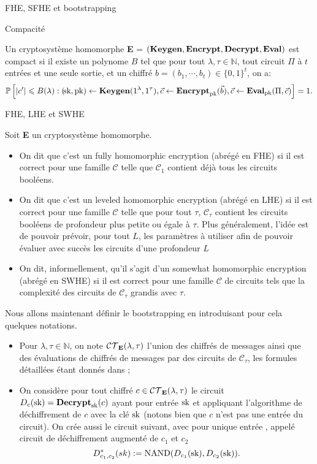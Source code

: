 \begin{section}{FHE, SFHE et bootstrapping}
\begin{definition}{Compacité}

Un cryptosystème homomorphe \textbf{E} = $(\text{\textbf{Keygen}}, \text{\textbf{Encrypt}}, \text{\textbf{Decrypt}}, \text{\textbf{Eval}})$ 
est compact si il existe un polynome $B$ tel que pour tout $\lambda, \tau
\in \mathbb{N}$, tout circuit $\Pi$ à $t$ entrées et une seule sortie, et un
chiffré $b = (b_1,\cdots,b_t) \in \{0,1\}^t$, on a:
\[ 
\mathbb{P} \left[ |c'| \leqslant B(\lambda): (\!\text{sk},\text{pk}) \leftarrow \text{\textbf{Keygen}}(1^\lambda,
1^\tau), \vec{c} \leftarrow \text{\textbf{Encrypt}}_{\text{pk}}(\vec{b}), \vec{c} \leftarrow 
\text{\textbf{Eval}}_{\text{pk}}(\Pi, \vec{c}) \right] = 1.
\]
\end{definition}

\begin{definition}{FHE, LHE et SWHE}

Soit \textbf{E} un cryptosystème homomorphe.
\begin{itemize}
\item On dit que c'est un fully homomorphic encryption (abrégé en FHE) si il est correct pour
une famille $\mathcal{C}$ telle que $\mathcal{C}_1$ contient déjà tous les
circuits booléens. 
\item On dit que c'est un  leveled homomorphic encryption (abrégé en LHE)  si il est correct pour une famille
$\mathcal{C}$ telle que pour tout $\tau$, $\mathcal{C}_\tau$ contient les circuits booléens de profondeur plus petite ou
égale à $\tau$. Plus généralement, l'idée est de pouvoir prévoir, pour tout $L$, les paramètres à utiliser afin de
pouvoir évaluer avec succès les circuits d'une profondeur $L$ 
\item On dit, informellement, qu'il s'agit d'un somewhat homomorphic encryption (abrégé en SWHE) si il est correct pour
une famille $\mathcal{C}$ de circuits tels que la complexité des circuits de $\mathcal{C}_\tau$ grandis avec $\tau$.
\end{itemize}
\end{definition}

Nous allons maintenant définir le bootstrapping en introduisant pour cela
quelques notations.

\begin{itemize}
\item Pour $\lambda, \tau \in \mathbb{N}$, on note
$\mathcal{CT}_{\text{\textbf{E}}}(\lambda,\tau)$ l'union des chiffrés de messages 
ainsi que des évaluations de chiffrés de messages par des circuits de 
$\mathcal{C}_\tau$, les formules détaillées étant donnés dans \cite{halevi};
\item On considère pour tout chiffré $c\in\mathcal{CT}_{\text{\textbf{E}}}(\lambda,\tau)$ 
le circuit $D_c(\text{sk}) = \text{\textbf{Decrypt}}_{\text{sk}}(c)$ ayant pour entrée $\text{sk}$ et appliquant 
l'algorithme de déchiffrement de $c$ avec la clé $\text{sk}$ (notons bien que $c$
n'est pas une entrée du circuit). On crée aussi le circuit suivant, avec pour
unique entrée \sk, appelé circuit de déchiffrement augmenté de $c_1$ et $c_2$
\[ D^*_{c_1,c_2}(sk) := \text{NAND}(D_{c_1}(\text{sk}), D_{c_2}(\text{sk})).\]
\end{itemize}


\end{section}
